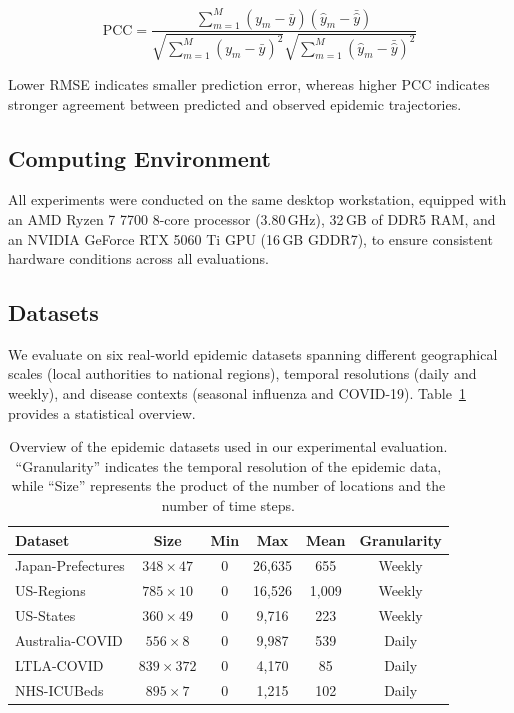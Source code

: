 \documentclass[final,1p,times]{elsarticle}
\begin{document}
\begin{equation}
\mathrm{PCC} = \frac{\sum_{m=1}^{M} (y_m - \bar{y})(\hat{y}_m - \bar{\hat{y}})}{\sqrt{\sum_{m=1}^{M} (y_m - \bar{y})^2} \sqrt{\sum_{m=1}^{M} (\hat{y}_m - \bar{\hat{y}})^2}}
\end{equation}

Lower RMSE indicates smaller prediction error, whereas higher PCC indicates stronger agreement between predicted and observed epidemic trajectories.

\subsection{Computing Environment}
\label{sec:experimental_setup}

All experiments were conducted on the same desktop workstation, equipped with an AMD Ryzen 7 7700 8-core processor (3.80\,GHz), 32\,GB of DDR5 RAM, and an NVIDIA GeForce RTX 5060 Ti GPU (16\,GB GDDR7), to ensure consistent hardware conditions across all evaluations.

\subsection{Datasets}
\label{sec:datasets}

We evaluate on six real-world epidemic datasets spanning different geographical scales (local authorities to national regions), temporal resolutions (daily and weekly), and disease contexts (seasonal influenza and COVID-19). Table~\ref{tab:datasets} provides a statistical overview.

\begin{table}[!htbp]
\centering
\caption{Overview of the epidemic datasets used in our experimental evaluation. ``Granularity'' indicates the temporal resolution of the epidemic data, while ``Size'' represents the product of the number of locations and the number of time steps.}
\label{tab:datasets}
\begin{tabular}{lccccc}
\hline
\textbf{Dataset} & \textbf{Size} & \textbf{Min} & \textbf{Max} & \textbf{Mean} & \textbf{Granularity} \\
\hline
Japan-Prefectures & $348 \times 47$ & 0 & 26,635 & 655 & Weekly \\
US-Regions & $785 \times 10$ & 0 & 16,526 & 1,009 & Weekly \\
US-States & $360 \times 49$ & 0 & 9,716 & 223 & Weekly \\
Australia-COVID & $556 \times 8$ & 0 & 9,987 & 539 & Daily \\
LTLA-COVID & $839 \times 372$ & 0 & 4,170 & 85 & Daily \\
NHS-ICUBeds & $895 \times 7$ & 0 & 1,215 & 102 & Daily \\
\hline
\end{tabular}
\end{table}
\end{document}
